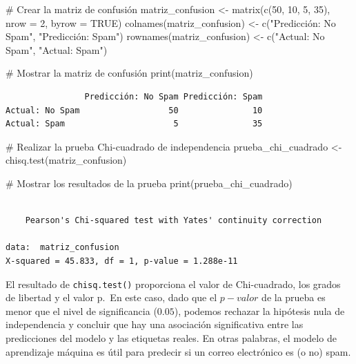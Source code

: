 \documentclass[
  letterpaper,
  DIV=11,
  numbers=noendperiod]{scrreprt}
\newenvironment{Shaded}{\begin{snugshade}}{\end{snugshade}}
\newcommand{\AttributeTok}[1]{\textcolor[rgb]{0.40,0.45,0.13}{#1}}
\newcommand{\CommentTok}[1]{\textcolor[rgb]{0.37,0.37,0.37}{#1}}
\newcommand{\ConstantTok}[1]{\textcolor[rgb]{0.56,0.35,0.01}{#1}}
\newcommand{\DecValTok}[1]{\textcolor[rgb]{0.68,0.00,0.00}{#1}}
\newcommand{\FunctionTok}[1]{\textcolor[rgb]{0.28,0.35,0.67}{#1}}
\newcommand{\NormalTok}[1]{\textcolor[rgb]{0.00,0.23,0.31}{#1}}
\newcommand{\OtherTok}[1]{\textcolor[rgb]{0.00,0.23,0.31}{#1}}
\newcommand{\StringTok}[1]{\textcolor[rgb]{0.13,0.47,0.30}{#1}}
\begin{document}
\begin{tcolorbox}
\begin{Shaded}
\begin{Highlighting}[]
\CommentTok{\# Crear la matriz de confusión}
\NormalTok{matriz\_confusion }\OtherTok{\textless{}{-}} \FunctionTok{matrix}\NormalTok{(}\FunctionTok{c}\NormalTok{(}\DecValTok{50}\NormalTok{, }\DecValTok{10}\NormalTok{, }\DecValTok{5}\NormalTok{, }\DecValTok{35}\NormalTok{), }\AttributeTok{nrow =} \DecValTok{2}\NormalTok{, }\AttributeTok{byrow =} \ConstantTok{TRUE}\NormalTok{)}
\FunctionTok{colnames}\NormalTok{(matriz\_confusion) }\OtherTok{\textless{}{-}} \FunctionTok{c}\NormalTok{(}\StringTok{"Predicción: No Spam"}\NormalTok{, }\StringTok{"Predicción: Spam"}\NormalTok{)}
\FunctionTok{rownames}\NormalTok{(matriz\_confusion) }\OtherTok{\textless{}{-}} \FunctionTok{c}\NormalTok{(}\StringTok{"Actual: No Spam"}\NormalTok{, }\StringTok{"Actual: Spam"}\NormalTok{)}

\CommentTok{\# Mostrar la matriz de confusión}
\FunctionTok{print}\NormalTok{(matriz\_confusion)}
\end{Highlighting}
\end{Shaded}

\begin{verbatim}
                Predicción: No Spam Predicción: Spam
Actual: No Spam                  50               10
Actual: Spam                      5               35
\end{verbatim}

\begin{Shaded}
\begin{Highlighting}[]
\CommentTok{\# Realizar la prueba Chi{-}cuadrado de independencia}
\NormalTok{prueba\_chi\_cuadrado }\OtherTok{\textless{}{-}} \FunctionTok{chisq.test}\NormalTok{(matriz\_confusion)}

\CommentTok{\# Mostrar los resultados de la prueba}
\FunctionTok{print}\NormalTok{(prueba\_chi\_cuadrado)}
\end{Highlighting}
\end{Shaded}

\begin{verbatim}

    Pearson's Chi-squared test with Yates' continuity correction

data:  matriz_confusion
X-squared = 45.833, df = 1, p-value = 1.288e-11
\end{verbatim}

El resultado de \texttt{chisq.test()} proporciona el valor de
Chi-cuadrado, los grados de libertad y el valor p.~En este caso, dado
que el \(p-valor\) de la prueba es menor que el nivel de significancia
(\(0.05\)), podemos rechazar la hipótesis nula de independencia y
concluir que hay una asociación significativa entre las predicciones del
modelo y las etiquetas reales. En otras palabras, el modelo de
aprendizaje máquina es útil para predecir si un correo electrónico es (o
no) spam.

\end{tcolorbox}
\end{document}
